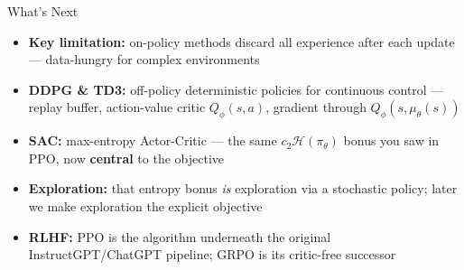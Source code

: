 \begin{frame}{What's Next}
\begin{itemize}
    \item \textbf{Key limitation:} on-policy methods discard all experience after each update --- data-hungry for complex environments
    \pause
    \item \textbf{DDPG \& TD3:} off-policy deterministic policies for continuous control --- replay buffer, action-value critic $Q_\phi(s,a)$, gradient through $Q_\phi(s,\mu_\theta(s))$
    \item \textbf{SAC:} max-entropy Actor-Critic --- the same $c_2\mathcal{H}(\pi_\theta)$ bonus you saw in PPO, now \textbf{central} to the objective
    \item \textbf{Exploration:} that entropy bonus \emph{is} exploration via a stochastic policy; later we make exploration the explicit objective
    \item \textbf{RLHF:} PPO is the algorithm underneath the original InstructGPT/ChatGPT pipeline; GRPO is its critic-free successor
\end{itemize}
\end{frame}
